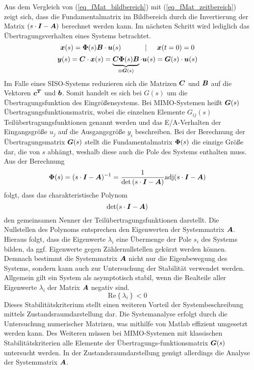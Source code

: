 Aus dem Vergleich von (\ref{eq_fMat_bildbereich}) mit (\ref{eq_fMat_zeitbereich}) zeigt sich, dass die Fundamentalmatrix im Bildbereich durch die Invertierung der Matrix $\left(s\cdot \boldsymbol{I}-\boldsymbol{A}\right)$ berechnet werden kann. Im nächsten Schritt wird lediglich das Übertragungsverhalten eines Systems betrachtet.
\begin{equation}
\boldsymbol{x}(s) = \boldsymbol{\Phi}(s)\boldsymbol{B}\cdot \boldsymbol{u}(s) \hspace{35pt} \vert \hspace{15pt} \boldsymbol{x}(t=0) = 0
\end{equation}
\begin{equation}
\boldsymbol{y}(s) = \boldsymbol{C}\cdot \boldsymbol{x}(s) = \underbrace{\boldsymbol{C}\boldsymbol{\Phi}(s)\boldsymbol{B}}_{\equiv \boldsymbol{G}(s)}\cdot \boldsymbol{u}(s) = \boldsymbol{G}(s)\cdot \boldsymbol{u}(s)
\end{equation}
Im Falle eines SISO-Systems reduzieren sich die Matrizen $\boldsymbol{C}$ und $\boldsymbol{B}$ auf die Vektoren $\boldsymbol{c^T}$ und $\boldsymbol{b}$. Somit handelt es sich bei $G(s)$ um die Übertragungsfunktion des Eingrößensystems. Bei MIMO-Systemen heißt $\boldsymbol{G}(s)$ Übertragungsfunktionsmatrix, wobei die einzelnen Elemente $G_{ij}(s)$ Teilübertragungsfunktionen genannt werden und das E/A-Verhalten der Eingangsgröße $u_j$ auf die Ausgangsgröße $y_i$ beschreiben. Bei der Berechnung der Übertragungsmatrix $\boldsymbol{G}(s)$ stellt die Fundamentalmatrix $\boldsymbol{\Phi}(s)$ die einzige Größe dar, die von $s$ abhängt, weshalb diese auch die Pole des Systems enthalten muss. Aus der Berechnung
\begin{equation}
\boldsymbol{\Phi}(s) = (s\cdot \boldsymbol{I}-\boldsymbol{A})^{-1} = \frac{1}{\text{det}\left(s\cdot \boldsymbol{I}  - \boldsymbol{A}\right)}\text{adj}(s\cdot \boldsymbol{I} - \boldsymbol{A})
\end{equation}
folgt, dass das charakteristische Polynom
\begin{equation}
\text{det}(s\cdot \boldsymbol{I}-\boldsymbol{A})
\end{equation}
den gemeinsamen Nenner der Teilübertragungsfunktionen darstellt. Die Nullstellen des Polynoms entsprechen den Eigenwerten der Systemmatrix $\boldsymbol{A}$. Hieraus folgt, dass die Eigenwerte $\lambda_i$ eine Übermenge der Pole $s_i$ des Systems bilden, da ggf. Eigenwerte gegen  Zählernullstellen gekürzt werden können.
Demnach bestimmt die Systemmatrix $\boldsymbol{A}$ nicht nur die Eigenbewegung des Systems, sondern kann auch zur Untersuchung der Stabilität verwendet werden. Allgemein gilt ein System als asymptotisch stabil, wenn die Realteile aller Eigenwerte $\lambda_i$ der Matrix $\boldsymbol{A}$ negativ sind.
\begin{equation}
\text{Re}\left\{\lambda_i\right\} < 0
\end{equation}
Dieses Stabilitätskriterium stellt einen weiteren Vorteil der Systembeschreibung mittels Zustandsraumdarstellung dar. Die Systemanalyse erfolgt durch die Untersuchung numerischer Matrizen, was mithilfe von Matlab effizient umgesetzt werden kann. Des Weiteren müssen bei MIMO-Systemen mit klassischen Stabilitätskriterien alle Elemente der Übertragungs-funktionsmatrix $\boldsymbol{G}(s)$ untersucht werden. In der Zustandsraumdarstellung genügt allerdings die Analyse der Systemmatrix $\boldsymbol{A}$.
